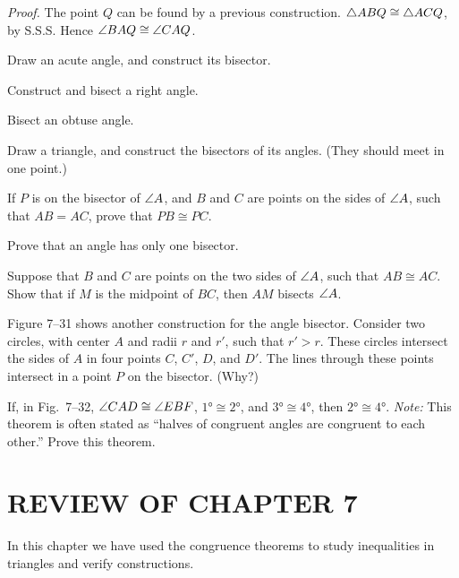 \documentclass[11pt]{book}
\begin{document}
\noindent\emph{Proof.}\quad
The point $Q$ can be found by a previous construction.
$\triangle ABQ \cong \triangle ACQ$, by S.S.S. Hence $\angle BAQ \cong \angle CAQ$.

\FIGVIITHIRTY

\begin{exercisecols}
\begin{exlist}
\item Draw an acute angle, and construct its bisector.
\item Construct and bisect a right angle.
\item Bisect an obtuse angle.
\item Draw a triangle, and construct the bisectors of its angles. (They should
  meet in one point.)
\item If $P$ is on the bisector of $\angle A$, and $B$ and $C$ are points on the
  sides of $\angle A$, such that $AB = AC$, prove that $PB \cong PC$.
\item Prove that an angle has only one bisector.
\item Suppose that $B$ and $C$ are points on the two sides of $\angle A$, such
  that $AB \cong AC$. Show that if $M$ is the midpoint of $BC$, then $AM$
  bisects $\angle A$.
\item[\stex 8.] Figure 7--31 shows another construction for the angle bisector.
  Consider two circles, with center $A$ and radii $r$ and $r'$, such that
  $r' > r$. These circles intersect the sides of $A$ in four points $C$, $C'$,
  $D$, and $D'$. The lines through these points intersect in a point $P$ on the
  bisector. (Why?)
\exfig{\FIGVIITHIRTYONE}
\item[\stex 9.] If, in Fig.~7--32, $\angle CAD \cong \angle EBF$,
  $\ang{1} \cong \ang{2}$, and $\ang{3} \cong \ang{4}$, then
  $\ang{2} \cong \ang{4}$. \emph{Note:} This theorem is often stated as
  ``halves of congruent angles are congruent to each other.'' Prove this
  theorem.
\exfig{\FIGVIITHIRTYTWO}
\end{exlist}
\end{exercisecols}

\section*{REVIEW OF CHAPTER 7}

In this chapter we have used the congruence theorems to study inequalities in
triangles and verify constructions.
\end{document}
